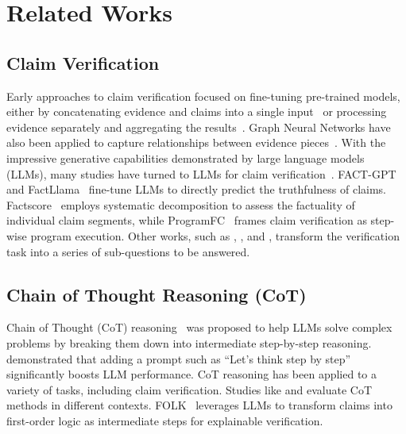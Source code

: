 \section{Related Works}
\subsection{Claim Verification}

Early approaches to claim verification focused on fine-tuning pre-trained models, either by concatenating evidence and claims into a single input~\cite{aly2021feverous, thorne2018fever, hu2022dual} or processing evidence separately and aggregating the results~\cite{soleimani2020bert, jiang2021exploring,gi-etal-2021-verdict}. Graph Neural Networks have also been applied to capture relationships between evidence pieces~\cite{gong2024heterogeneous, Zhaotransxh, Chenevidencenet}. With the impressive generative capabilities demonstrated by large language models (LLMs), many studies have turned to LLMs for claim verification~\cite{ma-etal-2024-ex}. FACT-GPT~\cite{factgpt} and FactLlama~\cite{cheung2023factllama} fine-tune LLMs to directly predict the truthfulness of claims. Factscore~\cite{min2023factscore} employs systematic decomposition to assess the factuality of individual claim segments, while ProgramFC~\cite{pan2023fact} frames claim verification as step-wise program execution. Other works, such as \citet{li2023self}, \citet{chen2022generating}, and \citet{rani2023factify}, transform the verification task into a series of sub-questions to be answered.


\subsection{Chain of Thought Reasoning (CoT)}
Chain of Thought (CoT) reasoning~\cite{wei2022chain} was proposed to help LLMs solve complex problems by breaking them down into intermediate step-by-step reasoning. \citet{kojima2022large} demonstrated that adding a prompt such as ``Let's think step by step'' significantly boosts LLM performance. CoT reasoning has been applied to a variety of tasks, including claim verification. Studies like \citet{hu2023large} and \citet{dougrez2024assessing} evaluate CoT methods in different contexts. FOLK~\cite{wang2023explainable} leverages LLMs to transform claims into first-order logic as intermediate steps for explainable verification.

